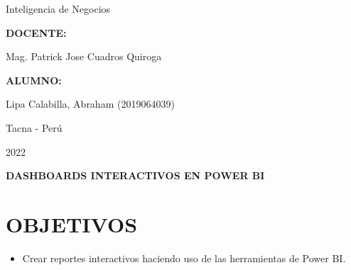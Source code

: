 \documentclass[12pt,letterpaper]{article}
\begin{document}
\begin{titlepage}
\begin{center}
\begin{large}
                Inteligencia de Negocios\\
            \end{large}
            \vspace*{0.2in}
            \begin{Large}
                \textbf{DOCENTE:} \\
            \end{Large}
            \vspace*{0.1in}
            \begin{large}
                Mag. Patrick Jose Cuadros Quiroga\\
            \end{large}
            \vspace*{0.3in}
            \begin{large}
                \textbf{ALUMNO:} \\
                \begin{flushleft}
                    Lipa Calabilla, Abraham  		\hfill	(2019064039) \\
                \end{flushleft}
            \end{large}
            \vspace*{1.3in}
            \begin{large}
                Tacna - Perú\\
            \end{large}
            \vspace*{0.1in}
            \begin{large}
                2022\\
            \end{large}
        \end{center}
    \end{titlepage}
    
    \newpage
    \tableofcontents
    \justify
    \newpage
    \begin{LARGE}
        \begin{center}
            \textbf{DASHBOARDS INTERACTIVOS EN POWER BI} \\
        \end{center}
    \end{LARGE}
    \section{OBJETIVOS}
    \begin{itemize}
        \item Crear reportes interactivos haciendo uso de las herramientas de Power BI.
    \end{itemize}
    
\end{document}
